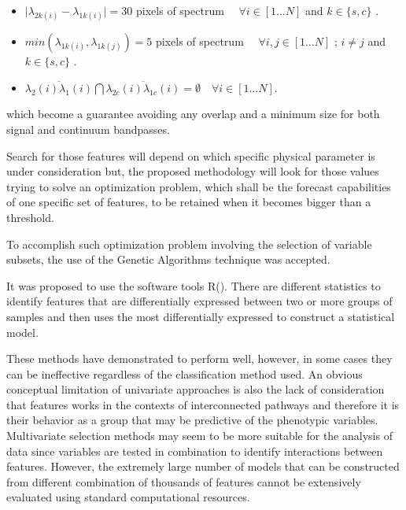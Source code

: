 {{\begin{itemize}
 \item { $ \vert \lambda_{2k(i)} - \lambda_{1k(i)} \vert = 30 $ pixels of spectrum $ \quad \forall i \in [1 \ldots N]$ and $ k \in \{s,c\} $ .}
 \item { $ min ( \lambda_{1k(i)}, \lambda_{1k(j)} ) = 5 $ pixels of spectrum $ \quad \forall i,j \in [1 \ldots N] $ ; $ i \neq j $ and $ k \in \{s,c\} $ .}
 \item { $ \overline{\lambda_{2}(i)\lambda_{1}(i)}  \bigcap 
                      \overline{\lambda_{2c}(i)\lambda_{1c}(i)} = \emptyset \quad \forall i \in [1 \ldots N]$.}
\end{itemize}

which become a guarantee avoiding any overlap 
and a minimum size for both signal and continuum bandpasses.
}

{
Search for those features will depend on which specific physical parameter is 
under consideration but, the proposed methodology will look for those values 
trying to solve an optimization problem, which shall be the forecast capabilities
of one specific set of features, to be retained when it becomes bigger than 
a threshold.

To accomplish such optimization problem involving the selection of variable 
subsets, the use of the Genetic Algorithms technique was accepted. 
}

{ It was proposed to use the software tools R(\cite{R2013}).  There
  are different statistics to identify features that are
  differentially expressed between two or more groups of samples and
  then uses the most differentially expressed to construct a
  statistical model.  }

{ These methods have demonstrated to perform well, however, in some
  cases they can be ineffective regardless of the classification
  method used. An obvious conceptual limitation of univariate
  approaches is also the lack of consideration that features works in
  the contexts of interconnected pathways and therefore it is their
  behavior as a group that may be predictive of the phenotypic
  variables. Multivariate selection methods may seem to be more
  suitable for the analysis of data since variables are tested in
  combination to identify interactions between features. However, the
  extremely large number of models that can be constructed from
  different combination of thousands of features cannot be extensively
  evaluated using standard computational resources.  }

}
